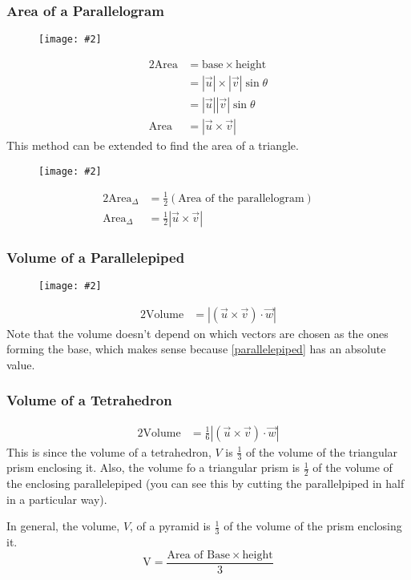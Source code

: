 \documentclass[letterpaper, 12pt]{report}
\newcommand{\diagram}[2][0.5]{
	\begin{figure}[H]
		\centering
		\texttt{[image: \#2]}
	\end{figure}
	}
\theoremstyle{definition}
\numberwithin{equation}{section}
\begin{document}
\subsubsection*{Area of a Parallelogram}
\diagram{parallelogram}
\begin{alignat}{2}
	\mathrm{Area} &= \mathrm{base} \times \mathrm{height} \nonumber \\
								&= |\vec u| \times |\vec v| \sin \theta \nonumber \\
								&= |\vec u| |\vec v| \sin \theta \nonumber \\
	\mathrm{Area} &= |\vec u \times \vec v|
\end{alignat}
This method can be extended to find the area of a triangle.
\diagram{triangle}
\begin{alignat}{2}
	\mathrm{Area}_\Delta &= \frac{1}{2}(\textrm{Area of the parallelogram}) \nonumber \\
	\mathrm{Area}_\Delta &= \frac{1}{2} \left|\vec u \times \vec v\right|
\end{alignat}

\subsubsection*{Volume of a Parallelepiped}
\diagram{parallelepiped}
\begin{alignat}{2}
	\mathrm{Volume} &= \left|(\vec u \times \vec v) \cdot \vec w\right|
	\label{parallelepiped}
\end{alignat}
Note that the volume doesn't depend on which vectors are chosen as the ones forming the base, which makes sense because \eqref{parallelepiped} has an absolute value.

\subsubsection{Volume of a Tetrahedron}
\begin{alignat}{2}
	\mathrm{Volume} &= \frac{1}{6} \left|(\vec u \times \vec v) \cdot \vec w\right|
\end{alignat}
This is since the volume of a tetrahedron, $V$ is $\frac{1}{3}$ of the volume of the triangular prism enclosing it. Also, the volume fo a triangular prism is $\frac{1}{2}$ of the volume of the enclosing parallelepiped (you can see this by cutting the parallelpiped in half in a particular way).

In general, the volume, $V$, of a pyramid is $\frac{1}{3}$ of the volume of the prism enclosing it.
\begin{equation*}
	\mathrm{V} = \frac{\textrm{Area of Base} \times \mathrm{height}}{3}
\end{equation*}
\end{document}
